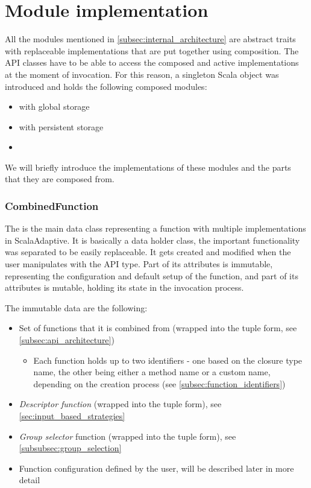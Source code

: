 \section{Module implementation}
\label{sec:module_impl}

All the modules mentioned in \ref{subsec:internal_architecture} are abstract traits with replaceable implementations that are put together using composition. The API classes have to be able to access the composed and active implementations at the moment of invocation. For this reason, a singleton Scala object  was introduced and holds the following composed modules:

\begin{itemize}
	\item {} with global storage
	\item {} with persistent storage
	\item {}
\end{itemize}

We will briefly introduce the implementations of these modules and the parts that they are composed from.

\subsubsection{CombinedFunction}

The  is the main data class representing a function with multiple implementations in ScalaAdaptive. It is basically a data holder class, the important functionality was separated to be easily replaceable. It gets created and modified when the user manipulates with the  API type. Part of its attributes is immutable, representing the configuration and default setup of the function, and part of its attributes is mutable, holding its state in the invocation process.

The immutable data are the following:

\begin{itemize}
	\item Set of functions that it is combined from (wrapped into the tuple form, see \ref{subsec:api_architecture})
	\begin{itemize}
		\item	Each function holds up to two identifiers - one based on the closure type name, the other being either a method name or a custom name, depending on the creation process (see \ref{subsec:function_identifiers})
	\end{itemize}
	\item \textit{Descriptor function} (wrapped into the tuple form), see \ref{sec:input_based_strategies}
	\item \textit{Group selector} function (wrapped into the tuple form), see \ref{subsubsec:group_selection}
	\item Function configuration defined by the user, will be described later in more detail
\end{itemize}

